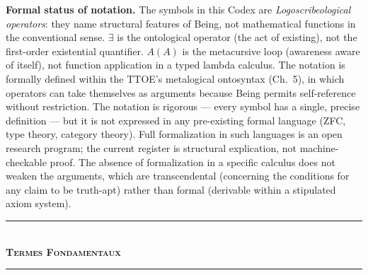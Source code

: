 \documentclass[10pt, openany, oneside]{book}
\renewcommand{\normalsize}{\fontsize{10}{13}\selectfont}
\renewcommand{\footnotesize}{\fontsize{8.5}{11}\selectfont}
\begin{document}
\vspace{0.5em}

{\footnotesize
\noindent\textbf{Formal status of notation.} The symbols in this Codex are \textit{Logoscribeological operators}: they name structural features of Being, not mathematical functions in the conventional sense. $\exists$ is the ontological operator (the act of existing), not the first-order existential quantifier. $A(A)$ is the metacursive loop (awareness aware of itself), not function application in a typed lambda calculus. The notation is formally defined within the TTOE's metalogical ontosyntax (Ch.\ 5), in which operators can take themselves as arguments because Being permits self-reference without restriction. The notation is rigorous --- every symbol has a single, precise definition --- but it is not expressed in any pre-existing formal language (ZFC, type theory, category theory). Full formalization in such languages is an open research program; the current register is structural explication, not machine-checkable proof. The absence of formalization in a specific calculus does not weaken the arguments, which are transcendental (concerning the conditions for any claim to be truth-apt) rather than formal (derivable within a stipulated axiom system).
}

\vspace{1.5em}

\newpage


\begin{center}
    \rule{0.3\textwidth}{0.4pt}\\[0.5em]
    {\normalsize\bfseries\scshape Termes Fondamentaux}\\[0.3em]
    \rule{0.3\textwidth}{0.4pt}
\end{center}

\vspace{1em}
\end{document}
